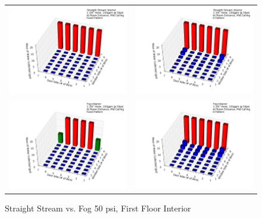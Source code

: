 \documentclass{article}
\begin{document}
\begin{appendices}
\clearpage

\begin{figure}[ht]
\begin{tabular*}{\textwidth}{lr}
\includegraphics[width=3.2in]{../ADD_Analysis/Figures/15-12-09_121955_Datafile_Straight_Stream_Interior.png} &
\includegraphics[width=3.2in]{../ADD_Analysis/Figures/15-12-09_122551_Datafile_Straight_Stream_Interior.png} \\
\includegraphics[width=3.2in]{../ADD_Analysis/Figures/15-12-09_123142_Datafile_Fog_Interior.png} &
\includegraphics[width=3.2in]{../ADD_Analysis/Figures/15-12-09_123636_Datafile_Fog_Interior.png} \\
\end{tabular*}
\caption{Straight Stream vs. Fog 50 psi, First Floor Interior}
\label{fig:Straight Stream vs. Fog 50 psi, First Floor Interior}
\end{figure}


\end{appendices}
\end{document}
